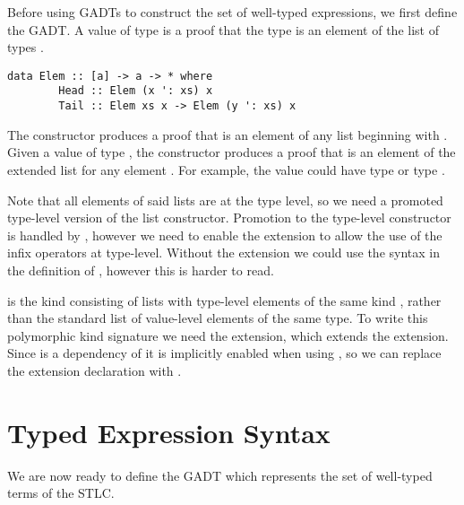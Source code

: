 Before using GADTs to construct the set of well-typed expressions, we first define the  GADT. A value of type  is a proof that the type  is an element of the list of types . \cite{GADTs} 

\begin{lstlisting}[morekeywords={a, [a], x, xs, y}]
    data Elem :: [a] -> a -> * where
        Head :: Elem (x ': xs) x
        Tail :: Elem xs x -> Elem (y ': xs) x
\end{lstlisting}

The  constructor produces a proof that  is an element of any list beginning with . Given a value of type , the  constructor produces a proof that  is an element of the extended list  for any element . For example, the value  could have type  or type . 

Note that all elements of said lists are at the type level, so we need a promoted type-level version of the \elemcode{(:)} list constructor. Promotion to the type-level constructor  is handled by , however we need to enable the  extension to allow the use of the infix operators at type-level. Without the  extension we could use the syntax  in the definition of , however this is harder to read.

\elemcode{[a]} is the kind consisting of lists with type-level elements of the same kind , rather than the standard list of value-level elements of the same type. To write this polymorphic kind signature we need the  extension, which extends the  extension. Since  is a dependency of  it is implicitly enabled when using , so we can replace the  extension declaration with .


\section{Typed Expression Syntax}
\label{sect:typedsyntax}

We are now ready to define the  GADT which represents the set of well-typed terms of the STLC.

